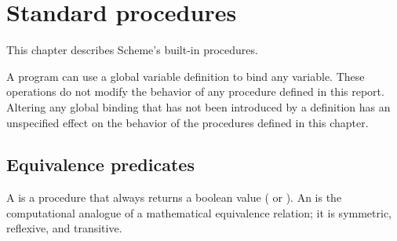 
\chapter{Standard procedures}
\label{initialenv}
\label{builtinchapter}


This chapter describes Scheme's built-in procedures.


A program can use a global variable definition to bind any variable.
These operations do not modify the behavior of
any procedure defined in this report. Altering any global binding that has
not been introduced by a definition has an unspecified effect on the
behavior of the procedures defined in this chapter.

\section{Equivalence predicates}
\label{equivalencesection}

A  is a procedure that always returns a boolean
value (\schtrue{} or \schfalse).  An  is
the computational analogue of a mathematical equivalence relation; it is
symmetric, reflexive, and transitive.



